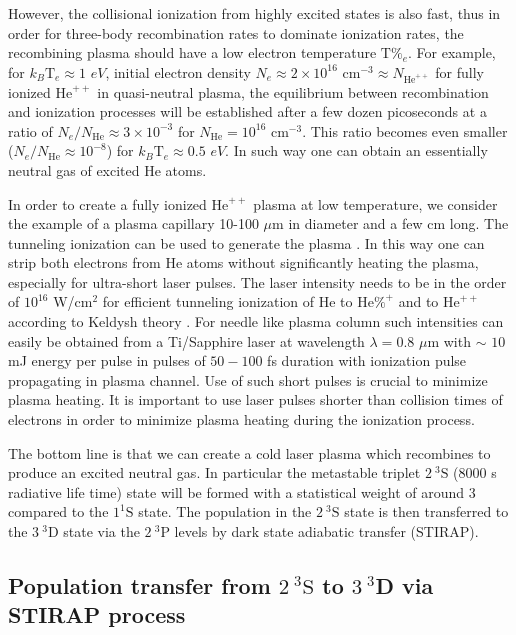 However, the collisional ionization from highly excited states is also fast,
thus in order for three-body recombination rates to dominate ionization
rates, the recombining plasma should have a low electron temperature $\text{T%
}_{e}$. For example, for $k_{B}\text{T}_{e}\approx 1$ $eV$, initial electron
density $N_{e}\approx 2\times 10^{16}$ cm$^{-3}\approx N_{\text{He}^{++}}$
for fully ionized $\text{He}^{++}$ in quasi-neutral plasma, the equilibrium
between recombination and ionization processes will be established after a
few dozen picoseconds at a ratio of $N_{e}/N_{\text{He}}\approx 3\times
10^{-3}$ for $N_{\text{He}}=10^{16}$ cm$^{-3}$. This ratio becomes even
smaller ($N_{e}/N_{\text{He}}\approx 10^{-8}$) for $k_{B}\text{T}_{e}\approx
0.5$ $eV$. In such way one can obtain an essentially neutral gas of excited
He atoms.

In order to create a fully ionized $\text{He}^{++}$ plasma at low
temperature, we consider the example of a plasma capillary 10-100 $\mu $m in
diameter and a few cm long. The tunneling ionization can be used to generate
the plasma \cite{Keld65,Burn89,avi04,avi07}. In this way one can strip both
electrons from He atoms without significantly heating the plasma, especially
for ultra-short laser pulses. The laser intensity needs to be in the order
of $10^{16}$ W/cm$^{2}$ for efficient tunneling ionization of He to $\text{He%
}^{+}$ and to $\text{He}^{++}$ according to Keldysh theory \cite{Keld65}.
For needle like plasma column such intensities can easily be obtained from a
Ti/Sapphire laser at wavelength $\lambda =0.8$ $\mu $m with $\sim $ $10$ mJ
energy per pulse in pulses of $50-100$ fs duration with ionization pulse
propagating in plasma channel. Use of such short pulses is crucial to
minimize plasma heating. It is important to use laser pulses shorter than
collision times of electrons in order to minimize plasma heating during the
ionization process.

The bottom line is that we can create a cold laser plasma which recombines
to produce an excited neutral gas. In particular the metastable triplet $%
2~^{3}\text{S}$ (8000 s radiative life time) state will be formed with a
statistical weight of around 3 compared to the $1^{1}\text{S}$ state. The
population in the $2~^{3}\text{S}$ state is then transferred to the $3~^{3}%
\text{D}$ state via the $2~^{3}\text{P}$ levels by dark state adiabatic
transfer (STIRAP).

\subsection{Population transfer from $2~^{3}\text{S}$ to $3~^{3}$D via STIRAP
  process}

